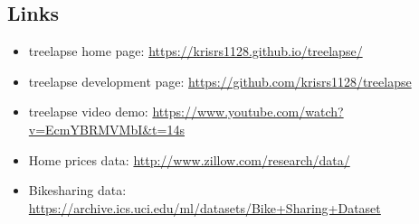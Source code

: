 \documentclass[12pt]{article}
\begin{document}
\subsection{Links}
\label{sec:supp_links}

\begin{itemize}
\item treelapse home page: \url{https://krisrs1128.github.io/treelapse/}
\item treelapse development page: \url{https://github.com/krisrs1128/treelapse}
\item treelapse video demo: \url{https://www.youtube.com/watch?v=EcmYBRMVMbI&t=14s}
\item Home prices data: \url{http://www.zillow.com/research/data/}
\item Bikesharing data: \url{https://archive.ics.uci.edu/ml/datasets/Bike+Sharing+Dataset}
\end{itemize}
\end{document}
